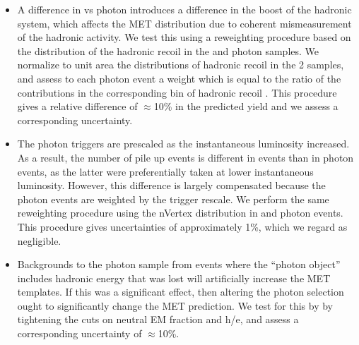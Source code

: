 \begin{itemize}
\item A difference in \Z \pt vs photon \pt introduces a difference in the boost of the hadronic system,
  which affects the MET distribution due to coherent mismeasurement of the hadronic activity. 
  We test this using a reweighting procedure based on the distribution of the hadronic recoil \pt
  in the \Z and photon samples. We normalize to unit area the distributions of hadronic recoil \pt in 
  the 2 samples,
  and assess to each photon event a weight which is equal to the ratio of the \Z \pt contributions in 
  the corresponding
  bin of hadronic recoil \pt. This procedure gives a relative difference of 
  $\approx$10\%
  in the predicted yield and we assess a corresponding uncertainty.

\item The photon triggers are prescaled as the instantaneous luminosity increased. As a result, the 
  number of pile up events is different in \Z events than in photon events, 
  as the latter were preferentially taken at lower instantaneous luminosity. However, this difference
  is largely compensated because the photon events are weighted by the trigger rescale. We perform the
  same reweighting procedure using the nVertex distribution in \Z and photon events. This procedure 
  gives uncertainties of approximately 1\%, which we regard as negligible.

\item Backgrounds to the photon sample from events where the ``photon object'' includes 
  hadronic energy that was lost will artificially increase the MET templates. 
  If this was a significant effect, then  altering the photon selection ought to significantly 
  change the MET prediction. We test for this
  by by tightening the cuts on neutral EM fraction and h/e, 
  and assess a corresponding uncertainty of 
  $\approx$10\%. %



\end{itemize}

